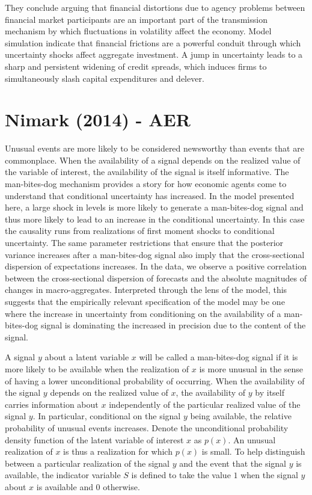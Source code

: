 \documentclass{article}
\begin{document}
{They conclude arguing that financial distortions due to agency problems between financial market participants are an important part of the transmission mechanism by which fluctuations in volatility affect the economy. Model simulation indicate that financial frictions are a powerful conduit through which uncertainty shocks affect aggregate investment. A jump in uncertainty leads to a sharp and persistent widening of credit spreads, which induces firms to simultaneously slash capital expenditures and delever. 

\section{Nimark (2014) - AER}

Unusual events are more likely to be considered newsworthy than events that are commonplace. When the availability of a signal depends on the realized value of the variable of interest, the availability of the signal is itself informative. The man-bites-dog mechanism provides a story for how economic agents come to understand that conditional uncertainty has increased. In the model presented here, a large shock in levels is more likely to generate a man-bites-dog signal and thus more likely to lead to an increase in the conditional uncertainty. In this case the causality runs from realizations of first moment shocks to conditional uncertainty. The same parameter restrictions that ensure that the posterior variance increases after a man-bites-dog signal also imply that the cross-sectional dispersion of expectations increases. In the data, we observe a positive correlation between the cross-sectional dispersion of forecasts and the absolute magnitudes of changes in macro-aggregates. Interpreted through the lens of the model, this suggests that the empirically relevant specification of the model may be one where the increase in uncertainty from conditioning on the availability of a man-bites-dog signal is dominating the increased in precision due to the content of the signal.

A signal $y$ about a latent variable $x$ will be called a man-bites-dog signal if it is more likely to be available when the realization of $x$ is more unusual in the sense of having a lower unconditional probability of occurring. When the availability of the signal $y$ depends on the realized value of $x$, the availability of $y$ by itself carries information about $x$ independently of the particular realized value of the signal $y$. In particular, conditional on the signal $y$ being available, the relative probability of unusual events increases. Denote the unconditional probability density function of the latent variable of interest $x$ as $p(x)$. An unusual realization of $x$ is thus a realization for which $p(x)$ is small. To help distinguish between a particular realization of the signal $y$ and the event that the signal $y$ is available, the indicator variable $S$ is defined to take the value $1$ when the signal $y$ about $x$ is available and $0$ otherwise. 

}
\end{document}
